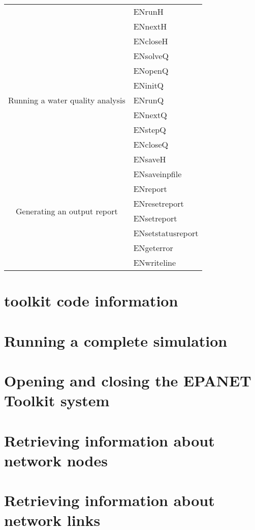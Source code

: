 \begin{longtable}{|c| l|}
&ENrunH\\
&ENnextH\\
&ENcloseH\\
\hline
\multirow{7}{*}{Running a water quality analysis}
&ENsolveQ\\
&ENopenQ\\
&ENinitQ\\
&ENrunQ\\
&ENnextQ\\
&ENstepQ\\
&ENcloseQ\\
\hline
\multirow{8}{*}{Generating an output report}
&ENsaveH\\
&ENsaveinpfile\\
&ENreport\\
&ENresetreport\\
&ENsetreport\\
&ENsetstatusreport\\
&ENgeterror\\
&ENwriteline\\
\hline
\end{longtable}


\section{toolkit code information}
 

\section{Running a complete simulation}
 

\section{Opening and closing the EPANET Toolkit system}
 
 

\section{Retrieving information about network nodes}
 
 
 
 

\section{Retrieving information about network links}
 
 
 
 
 

